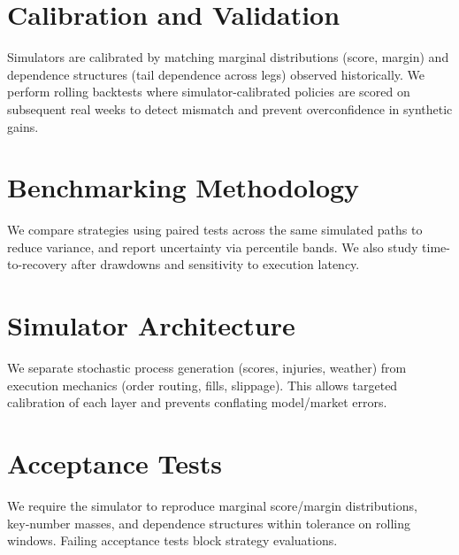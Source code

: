 \section{Calibration and Validation}
Simulators are calibrated by matching marginal distributions (score, margin) and dependence structures (tail dependence across legs) observed historically. We perform rolling backtests where simulator-calibrated policies are scored on subsequent real weeks to detect mismatch and prevent overconfidence in synthetic gains.


\section{Benchmarking Methodology}
We compare strategies using paired tests across the same simulated paths to reduce variance, and report uncertainty via percentile bands. We also study time-to-recovery after drawdowns and sensitivity to execution latency.


\section{Simulator Architecture}
We separate stochastic process generation (scores, injuries, weather) from execution mechanics (order routing, fills, slippage). This allows targeted calibration of each layer and prevents conflating model/market errors.

\section{Acceptance Tests}
We require the simulator to reproduce marginal score/margin distributions, key‑number masses, and dependence structures within tolerance on rolling windows. Failing acceptance tests block strategy evaluations.

